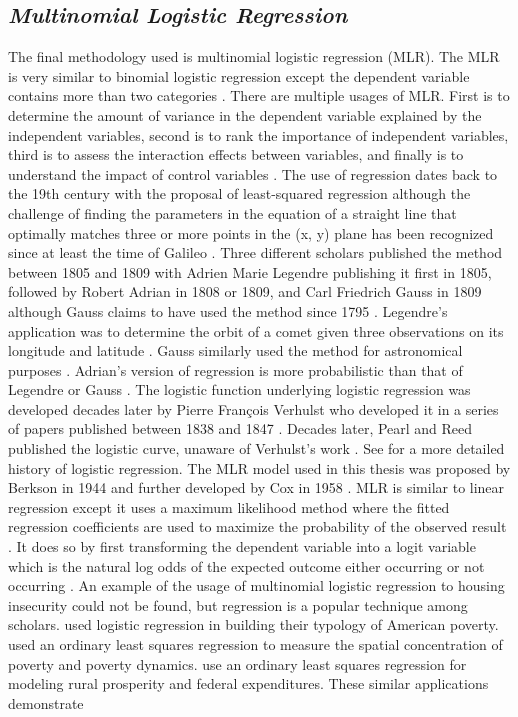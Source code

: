  
\subsection{\textit{Multinomial Logistic Regression}} 

The final methodology used is multinomial logistic regression (MLR). The MLR is very similar to binomial logistic regression except the dependent variable contains more than two categories \citep{bayaga_multinomial_2010}. There are multiple usages of MLR. First is to determine the amount of variance in the dependent variable explained by the independent variables, second is to rank the importance of independent variables, third is to assess the interaction effects between variables, and finally is to understand the impact of control variables \citep{el-habil_application_2012}. The use of regression dates back to the 19th century with the proposal of least-squared regression although the challenge of finding the parameters in the equation of a straight line that optimally matches three or more points in the (x, y) plane has been recognized since at least the time of Galileo \citep{harter_method_1974}. Three different scholars published the method between 1805 and 1809 with Adrien Marie Legendre publishing it first in 1805, followed by Robert Adrian in 1808 or 1809, and Carl Friedrich Gauss in 1809 although Gauss claims to have used the method since 1795 \citep{stigler_gauss_1981}. Legendre's application was to determine the orbit of a comet given three observations on its longitude and latitude \citep[1]{legendre_nouvelles_1805}. Gauss similarly used the method for astronomical purposes \citep{davis_theory_2007}. Adrian's version of regression is more probabilistic than that of Legendre or Gauss \citep{dutka_robert_1990}. The logistic function underlying logistic regression was developed decades later by Pierre François Verhulst who developed it in a series of papers published between 1838 and 1847 \citep{cramer_origins_2003}. Decades later, Pearl and Reed published the logistic curve, unaware of Verhulst's work \citep{kingsland_refractory_1982}. See \citet{cramer_origins_2003} for a more detailed history of logistic regression. The MLR model used in this thesis was proposed by Berkson in 1944 and further developed by Cox in 1958 \citep{msaouel_medicine_2022}. MLR is similar to linear regression except it uses a maximum likelihood method where the fitted regression coefficients are used to maximize the probability of the observed result \citep{jackson_data_2002}. It does so by first transforming the dependent variable into a logit variable which is the natural log odds of the expected outcome either occurring or not occurring \citep{white_logistic_2013}. An example of the usage of multinomial logistic regression to housing insecurity could not be found, but regression is a popular technique among scholars. \citet{peters_typology_2009} used logistic regression in building their typology of American poverty. \citet{crandall_local_2004} used an ordinary least squares regression to measure the spatial concentration of poverty and poverty dynamics. \citet{wilson_rural_2016} use an ordinary least squares regression for modeling rural prosperity and federal expenditures. These similar applications demonstrate 